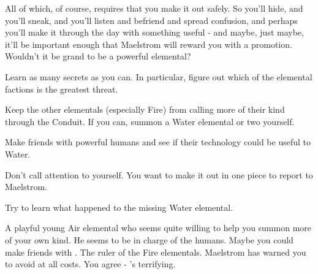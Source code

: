 \documentclass[char]{elementals}
\begin{document}
All of which, of course, requires that you make it out safely. So you’ll hide, and you’ll sneak, and you’ll listen and befriend and spread confusion, and perhaps you’ll make it through the day with something useful - and maybe, just maybe, it’ll be important enough that Maelstrom will reward you with a promotion. Wouldn’t it be grand to be a powerful elemental?

\begin{itemz}[Goals]
	\item  Learn as many secrets as you can. In particular, figure out which of the elemental factions is the greatest threat.
	\item  Keep the other elementals (especially Fire) from calling more of their kind through the Conduit. If you can, summon a Water elemental or two yourself.
	\item  Make friends with powerful humans and see if their technology could be useful to Water.
	\item  Don't call attention to yourself. You want to make it out in one piece to report to Maelstrom.
	\item  Try to learn what happened to the missing Water elemental.
\end{itemz}

\begin{contacts}
	\contact{\cMiniAir{\intro}} A playful young Air elemental who seems quite willing to help you summon more of your own kind.
	\contact{\cLeader{\intro}} He seems to be in charge of the humans. Maybe you could make friends with \cLeader{\them}.
  \contact{\cFireQueen{\intro}} The ruler of the Fire elementals. Maelstrom has warned you to avoid \cFireQueen{\them} at all costs. You agree - \cFireQueen{\they}'s terrifying.
\end{contacts} 
\end{document}
